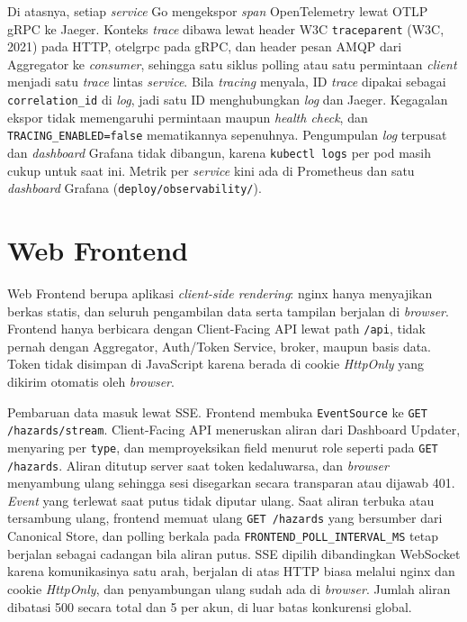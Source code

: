 Di atasnya, setiap \textit{service} Go mengekspor \textit{span} OpenTelemetry lewat OTLP gRPC ke Jaeger. Konteks \textit{trace} dibawa lewat header W3C \texttt{traceparent} (W3C, 2021) pada HTTP, otelgrpc pada gRPC, dan header pesan AMQP dari Aggregator ke \textit{consumer}, sehingga satu siklus polling atau satu permintaan \textit{client} menjadi satu \textit{trace} lintas \textit{service}. Bila \textit{tracing} menyala, ID \textit{trace} dipakai sebagai \texttt{correlation\_id} di \textit{log}, jadi satu ID menghubungkan \textit{log} dan Jaeger. Kegagalan ekspor tidak memengaruhi permintaan maupun \textit{health check}, dan \texttt{TRACING\_ENABLED=false} mematikannya sepenuhnya. Pengumpulan \textit{log} terpusat dan \textit{dashboard} Grafana tidak dibangun, karena \texttt{kubectl logs} per pod masih cukup untuk saat ini. Metrik per \textit{service} kini ada di Prometheus dan satu \textit{dashboard} Grafana (\texttt{deploy/observability/}).

\section{Web Frontend}

Web Frontend berupa aplikasi \textit{client-side rendering}: nginx hanya menyajikan berkas statis, dan seluruh pengambilan data serta tampilan berjalan di \textit{browser}. Frontend hanya berbicara dengan Client-Facing API lewat path \texttt{/api}, tidak pernah dengan Aggregator, Auth/Token Service, broker, maupun basis data. Token tidak disimpan di JavaScript karena berada di cookie \textit{HttpOnly} yang dikirim otomatis oleh \textit{browser}.

Pembaruan data masuk lewat SSE. Frontend membuka \texttt{EventSource} ke \texttt{GET /hazards/stream}. Client-Facing API meneruskan aliran dari Dashboard Updater, menyaring per \texttt{type}, dan memproyeksikan field menurut role seperti pada \texttt{GET /hazards}. Aliran ditutup server saat token kedaluwarsa, dan \textit{browser} menyambung ulang sehingga sesi disegarkan secara transparan atau dijawab 401. \textit{Event} yang terlewat saat putus tidak diputar ulang. Saat aliran terbuka atau tersambung ulang, frontend memuat ulang \texttt{GET /hazards} yang bersumber dari Canonical Store, dan polling berkala pada \texttt{FRONTEND\_POLL\_INTERVAL\_MS} tetap berjalan sebagai cadangan bila aliran putus. SSE dipilih dibandingkan WebSocket karena komunikasinya satu arah, berjalan di atas HTTP biasa melalui nginx dan cookie \textit{HttpOnly}, dan penyambungan ulang sudah ada di \textit{browser}. Jumlah aliran dibatasi 500 secara total dan 5 per akun, di luar batas konkurensi global.

